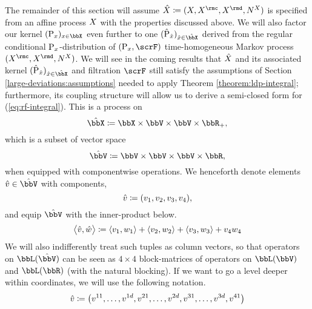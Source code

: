 The remainder of this section will assume $\hat\X \defeq (\X, \X^\rmc, \X^\rmd, \N^\X)$ is specified from an affine process $X$ with the properties discussed above.
We will also factor our kernel $(\Prb_\stateVar)_{\stateVar\in\stateSpace}$ even further to one $(\hat\Prb_{\hat\stateVar})_{\hat\stateVar\in\hat\stateSpace}$ derived from the regular conditional ${\operatorname{P}}_x$-distribution of $(\Prb_\stateVar, \scrF)$ time-homogeneous Markov process $(\X^\rmc, \X^\rmd, \N^\X)$.
We will see in the coming results that $\hat{X}$ and its associated kernel $(\hat\Prb_{\hat\stateVar})_{\hat\stateVar\in\hat\stateSpace}$ and filtration $\scrF$ still satisfy the assumptions of Section \ref{large-deviations:assumptions} needed to apply Theorem \ref{theorem:ldp-integral}; furthermore, its coupling structure will allow us to derive a semi-closed form for (\ref{eq:rf-integral}).
This is a process on 
\begin{equation*}
  \hat\stateSpace \defeq \stateSpace \times \vecSpace \times \vecSpace \times \bbR_+,
\end{equation*}
which is a subset of vector space
\begin{equation*}
  \hat\vecSpace \defeq \vecSpace \times \vecSpace \times \vecSpace \times \bbR,
\end{equation*}
when equipped with componentwise operations.
We henceforth denote elements $\hat\vecVar \in \hat\vecSpace$ with components,
\begin{equation*}
  \hat{v} \coloneqq (v_1, v_2, v_3, v_4),
\end{equation*}
and equip $\hat\vecSpace$ with the inner-product below.
\begin{equation*}
  {\big\langle \hat{v}, \hat w \big\rangle} \coloneqq {\langle v_1 , w_1 \rangle} + {\langle v_2 , w_2 \rangle} + {\langle v_3 , w_3 \rangle} + v_4 w_4
\end{equation*}
We will also indifferently treat such tuples as column vectors, so that operators on $\bbL(\hat\vecSpace)$ can be seen as $4\times4$ block-matrices of operators on $\bbL(\vecSpace)$ and $\bbL(\bbR)$ (with the natural blocking).
If we want to go a level deeper within coordinates, we will use the following notation.
\begin{equation*}
  \hat{v} \coloneqq \big(v^{11}, \ldots, v^{1d}, v^{21}, \ldots, v^{2d}, v^{31}, \ldots, v^{3d}, v^{41} \big)
\end{equation*}

